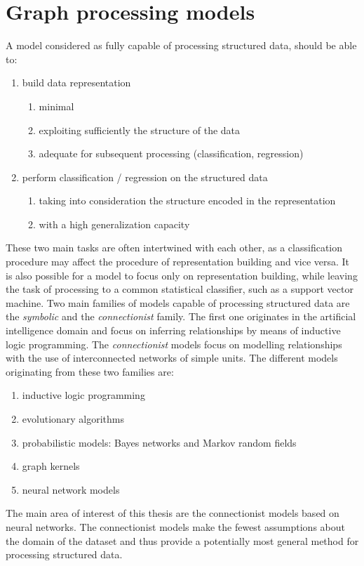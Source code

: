 
\chapter{Graph processing models}
\noindent A model considered as fully capable of processing structured data, should be able to:
\begin{enumerate}
	\item build data representation
	\begin{enumerate}
		\item minimal
		\item exploiting sufficiently the structure of the data
		\item adequate for subsequent processing (classification, regression)
	\end{enumerate}
	\item perform classification / regression on the structured data
	\begin{enumerate}
		\item taking into consideration the structure encoded in the representation
		\item with a high generalization capacity
	\end{enumerate}
\end{enumerate}
These two main tasks are often intertwined with each other, as a classification procedure may affect the procedure of representation building and vice versa. It is also possible for a model to focus only on representation building, while leaving the task of processing to a common statistical classifier, such as a support vector machine. Two main families of models capable of processing structured data are the \emph{symbolic} and the \emph{connectionist} family. The first one originates in the artificial intelligence domain and focus on inferring relationships by means of inductive logic programming. The \emph{connectionist} models focus on modelling relationships with the use of interconnected networks of simple units. The different models originating from these two families are:
\begin{enumerate}
	\item inductive logic programming
	\item evolutionary algorithms
	\item probabilistic models: Bayes networks and Markov random fields
	\item graph kernels
	\item neural network models
\end{enumerate}
The main area of interest of this thesis are the connectionist models based on neural networks. The connectionist models make the fewest assumptions about the domain of the dataset and thus provide a potentially most general method for processing structured data.
